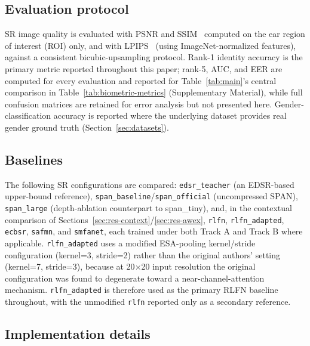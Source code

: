 \documentclass[11pt]{article}
\begin{document}
\subsection{Evaluation protocol}

SR image quality is evaluated with PSNR and SSIM~\cite{wang2004ssim} computed on the ear region of interest (ROI) only, and with LPIPS~\cite{zhang2018lpips} (using ImageNet-normalized features), against a consistent bicubic-upsampling protocol. Rank-1 identity accuracy is the primary metric reported throughout this paper; rank-5, AUC, and EER are computed for every evaluation and reported for Table~\ref{tab:main}'s central comparison in Table~\ref{tab:biometric-metrics} (Supplementary Material), while full confusion matrices are retained for error analysis but not presented here. Gender-classification accuracy is reported where the underlying dataset provides real gender ground truth (Section~\ref{sec:datasets}).

\subsection{Baselines}

The following SR configurations are compared: \texttt{edsr\_teacher} (an EDSR-based~\cite{lim2017edsr} upper-bound reference), \texttt{span\_baseline}/\texttt{span\_official} (uncompressed SPAN), \texttt{span\_large} (depth-ablation counterpart to span\_tiny), and, in the contextual comparison of Sections~\ref{sec:res-context}/\ref{sec:res-awex}, \texttt{rlfn}, \texttt{rlfn\_adapted}, \texttt{ecbsr}, \texttt{safmn}, and \texttt{smfanet}, each trained under both Track A and Track B where applicable. \texttt{rlfn\_adapted} uses a modified ESA-pooling kernel/stride configuration (kernel=3, stride=2) rather than the original authors' setting (kernel=7, stride=3), because at 20$\times$20 input resolution the original configuration was found to degenerate toward a near-channel-attention mechanism. \texttt{rlfn\_adapted} is therefore used as the primary RLFN baseline throughout, with the unmodified \texttt{rlfn} reported only as a secondary reference.

\subsection{Implementation details}
\label{sec:impl}
\end{document}
